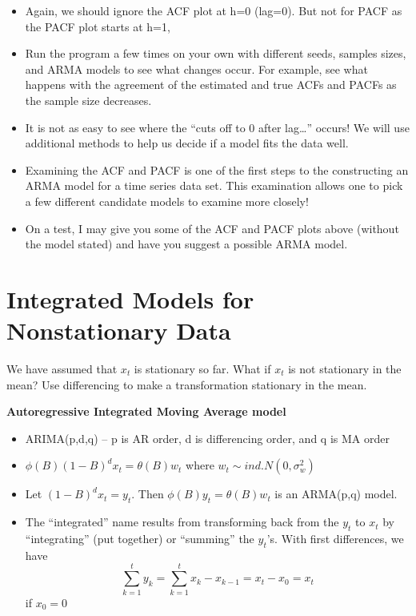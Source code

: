 \documentclass[
]{book}
\providecommand{\tightlist}{%
  \setlength{\itemsep}{0pt}\setlength{\parskip}{0pt}}
\theoremstyle{definition}
\theoremstyle{definition}
\theoremstyle{definition}
\theoremstyle{definition}
\theoremstyle{remark}
\begin{document}
\begin{itemize}
\tightlist
\item
  Again, we should ignore the ACF plot at h=0 (lag=0). But not for PACF as the PACF plot starts at h=1,
\item
  Run the program a few times on your own with different seeds, samples sizes, and ARMA models to see what changes occur. For example, see what happens with the agreement of the estimated and true ACFs and PACFs as the sample size decreases.\\
\item
  It is not as easy to see where the ``cuts off to 0 after lag\ldots{}'' occurs! We will use additional methods to help us decide if a model fits the data well.\\
\item
  Examining the ACF and PACF is one of the first steps to the constructing an ARMA model for a time series data set. This examination allows one to pick a few different candidate models to examine more closely!\\
\item
  On a test, I may give you some of the ACF and PACF plots above (without the model stated) and have you suggest a possible ARMA model.
\end{itemize}

\hypertarget{integrated-models-for-nonstationary-data}{%
\chapter{Integrated Models for Nonstationary Data}\label{integrated-models-for-nonstationary-data}}

We have assumed that \(x_t\) is stationary so far. What if \(x_t\) is not stationary in the mean? Use differencing to make a transformation stationary in the mean.

\textbf{Autoregressive Integrated Moving Average model}

\begin{itemize}
\tightlist
\item
  ARIMA(p,d,q) -- p is AR order, d is differencing order, and q is MA order
\item
  \(\phi(B)(1-B)^dx_t = \theta(B)w_t\) where \(w_t \sim ind. N(0,\sigma_w^2)\)
\item
  Let \((1-B)^dx_t = y_t.\) Then \(\phi(B)y_t = \theta(B)w_t\) is an ARMA(p,q) model.\\
\item
  The ``integrated'' name results from transforming back from the \(y_t\) to \(x_t\) by ``integrating'' (put together) or ``summing'' the \(y_t\)'s. With first differences, we have \[\sum_{k=1}^{t}y_k=\sum_{k=1}^{t}x_k-x_{k-1}=x_t-x_0=x_t\] if \(x_0=0\)
\end{itemize}
\end{document}

